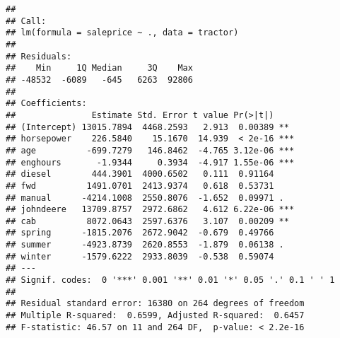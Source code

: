 \documentclass[
]{article}
\newenvironment{Shaded}{\begin{snugshade}}{\end{snugshade}}
\newcommand{\AttributeTok}[1]{\textcolor[rgb]{0.13,0.29,0.53}{#1}}
\newcommand{\CommentTok}[1]{\textcolor[rgb]{0.56,0.35,0.01}{\textit{#1}}}
\newcommand{\DecValTok}[1]{\textcolor[rgb]{0.00,0.00,0.81}{#1}}
\newcommand{\FunctionTok}[1]{\textcolor[rgb]{0.13,0.29,0.53}{\textbf{#1}}}
\newcommand{\NormalTok}[1]{#1}
\newcommand{\SpecialCharTok}[1]{\textcolor[rgb]{0.81,0.36,0.00}{\textbf{#1}}}
\newcommand{\StringTok}[1]{\textcolor[rgb]{0.31,0.60,0.02}{#1}}
\begin{document}
\begin{verbatim}
## 
## Call:
## lm(formula = saleprice ~ ., data = tractor)
## 
## Residuals:
##    Min     1Q Median     3Q    Max 
## -48532  -6089   -645   6263  92806 
## 
## Coefficients:
##               Estimate Std. Error t value Pr(>|t|)    
## (Intercept) 13015.7894  4468.2593   2.913  0.00389 ** 
## horsepower    226.5840    15.1670  14.939  < 2e-16 ***
## age          -699.7279   146.8462  -4.765 3.12e-06 ***
## enghours       -1.9344     0.3934  -4.917 1.55e-06 ***
## diesel        444.3901  4000.6502   0.111  0.91164    
## fwd          1491.0701  2413.9374   0.618  0.53731    
## manual      -4214.1008  2550.8076  -1.652  0.09971 .  
## johndeere   13709.8757  2972.6862   4.612 6.22e-06 ***
## cab          8072.0643  2597.6376   3.107  0.00209 ** 
## spring      -1815.2076  2672.9042  -0.679  0.49766    
## summer      -4923.8739  2620.8553  -1.879  0.06138 .  
## winter      -1579.6222  2933.8039  -0.538  0.59074    
## ---
## Signif. codes:  0 '***' 0.001 '**' 0.01 '*' 0.05 '.' 0.1 ' ' 1
## 
## Residual standard error: 16380 on 264 degrees of freedom
## Multiple R-squared:  0.6599, Adjusted R-squared:  0.6457 
## F-statistic: 46.57 on 11 and 264 DF,  p-value: < 2.2e-16
\end{verbatim}

\begin{Shaded}
\end{Shaded}
\end{document}
